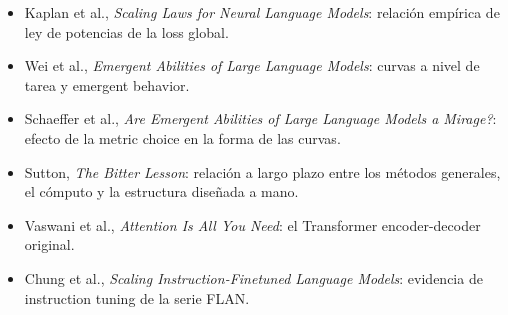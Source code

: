 \begin{itemize}
  \item Kaplan et al., \emph{Scaling Laws for Neural Language Models}: relación empírica de ley de potencias de la loss global.
  \item Wei et al., \emph{Emergent Abilities of Large Language Models}: curvas a nivel de tarea y emergent behavior.
  \item Schaeffer et al., \emph{Are Emergent Abilities of Large Language Models a Mirage?}: efecto de la metric choice en la forma de las curvas.
  \item Sutton, \emph{The Bitter Lesson}: relación a largo plazo entre los métodos generales, el cómputo y la estructura diseñada a mano.
  \item Vaswani et al., \emph{Attention Is All You Need}: el Transformer encoder-decoder original.
  \item Chung et al., \emph{Scaling Instruction-Finetuned Language Models}: evidencia de instruction tuning de la serie FLAN.
\end{itemize}



